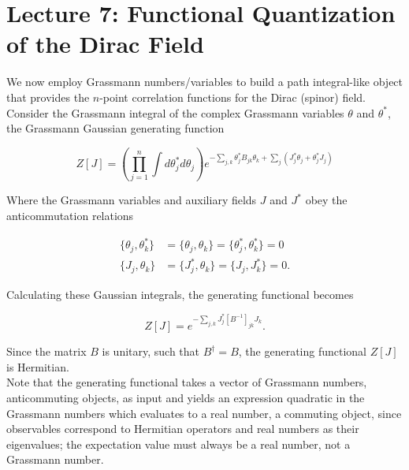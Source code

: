 \documentclass[10pt]{article}
\begin{document}
\section*{Lecture 7: Functional Quantization of the Dirac Field}
\label{sec: lec7}

\noindent We now employ Grassmann numbers/variables to build a path integral-like object that provides the $n$-point correlation functions for the Dirac (spinor) field. \\

\noindent Consider the Grassmann integral of the complex Grassmann variables $\theta$ and $\theta^*$, the Grassmann Gaussian generating function

\begin{equation}
Z[J] = \left( \prod_{j=1}^n \int d\theta^*_j d\theta_j \right) e^{- \sum_{j,k} \theta_j^* B_{jk} \theta_k + \sum_j (J_j^* \theta_j + \theta^*_j J_j) }
\end{equation}

\noindent Where the Grassmann variables and auxiliary fields $J$ and $J^*$ obey the anticommutation relations

\begin{align}
\{ \theta_j, \theta_k^* \} &= \{ \theta_j, \theta_k \} = \{\theta_j^*, \theta_k^* \} = 0 \\
\{J_j, \theta_k \} &= \{J_j^*, \theta_k \} = \{ J_j, J_k^* \} = 0.
\end{align}

\noindent Calculating these Gaussian integrals, the generating functional becomes

\begin{equation}
Z[J] = e^{- \sum_{j,k} J_j^* [B^{-1}]_{jk} J_k}.
\end{equation}

\noindent Since the matrix $B$ is unitary, such that $B^\dagger = B$, the generating functional $Z[J]$ is Hermitian. \\

\noindent Note that the generating functional takes a vector of Grassmann numbers, anticommuting objects, as input and yields an expression quadratic in the Grassmann numbers which evaluates to a real number, a commuting object, since observables correspond to Hermitian operators and real numbers as their eigenvalues; the expectation value must always be a real number, not a Grassmann number.

%

\end{document}
